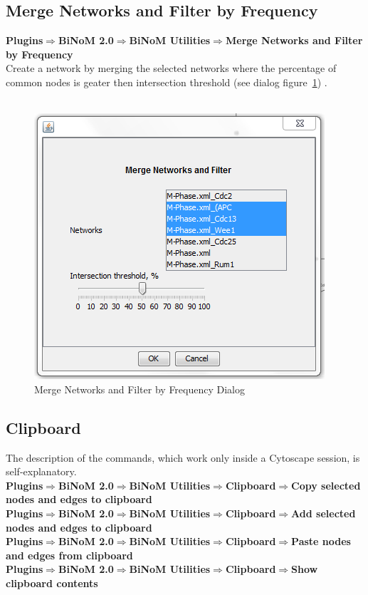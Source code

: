 \subsection{Merge Networks and Filter by Frequency}
\textbf{Plugins$\Rightarrow$BiNoM 2.0$\Rightarrow$BiNoM Utilities$\Rightarrow$Merge Networks and Filter by Frequency}\\
Create a network by merging the selected networks where the percentage of common nodes is geater then intersection threshold (see dialog figure~\ref{Merge_Networks_and_Filter}) .\\\\
\begin{figure}[h]
\centering
\includegraphics{graphics/Merge_Networks_and_Filter}
\caption{Merge Networks and Filter by Frequency Dialog}
\label{Merge_Networks_and_Filter}
\end{figure}

\subsection{Clipboard}
The description of the commands, which work only inside a Cytoscape session, is self-explanatory.\\
\textbf{Plugins$\Rightarrow$BiNoM 2.0$\Rightarrow$BiNoM Utilities$\Rightarrow$Clipboard$\Rightarrow$Copy selected nodes and edges to clipboard}\\
\textbf{Plugins$\Rightarrow$BiNoM 2.0$\Rightarrow$BiNoM Utilities$\Rightarrow$Clipboard$\Rightarrow$Add selected nodes and edges to clipboard}\\
\textbf{Plugins$\Rightarrow$BiNoM 2.0$\Rightarrow$BiNoM Utilities$\Rightarrow$Clipboard$\Rightarrow$Paste nodes and edges from clipboard}\\
\textbf{Plugins$\Rightarrow$BiNoM 2.0$\Rightarrow$BiNoM Utilities$\Rightarrow$Clipboard$\Rightarrow$Show clipboard contents}\\